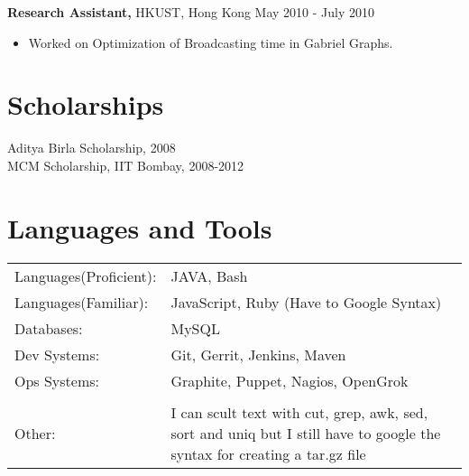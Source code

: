 \documentclass[margin]{res}
\begin{document}
\begin{resume}
 {\bf Research Assistant,} HKUST, Hong Kong \hfill May  2010  - July  2010
 \begin{itemize} \itemsep -2pt  %
 \item Worked  on  Optimization  of  Broadcasting  time  in  Gabriel  Graphs.
 \end{itemize}





\section{Scholarships}
Aditya Birla Scholarship, 2008 \\
MCM Scholarship, IIT Bombay, 2008-2012 \\


\section{Languages and Tools}
   \begin{tabular}{l p{3in}}
    {Languages(Proficient):} & JAVA, Bash \\
    {Languages(Familiar):} &  JavaScript, Ruby (Have to Google Syntax) \\
    {Databases:} &  MySQL \\
    {Dev Systems:} &  Git, Gerrit, Jenkins, Maven \\
    {Ops Systems:} &  Graphite, Puppet, Nagios, OpenGrok \\

    {} &   \\
    {Other:} & I can scult text with cut, grep, awk, sed, sort and uniq but I still have to google the syntax for creating a tar.gz file \\

 \end{tabular}


\bigskip
\bigskip


\end{resume}
\end{document}
